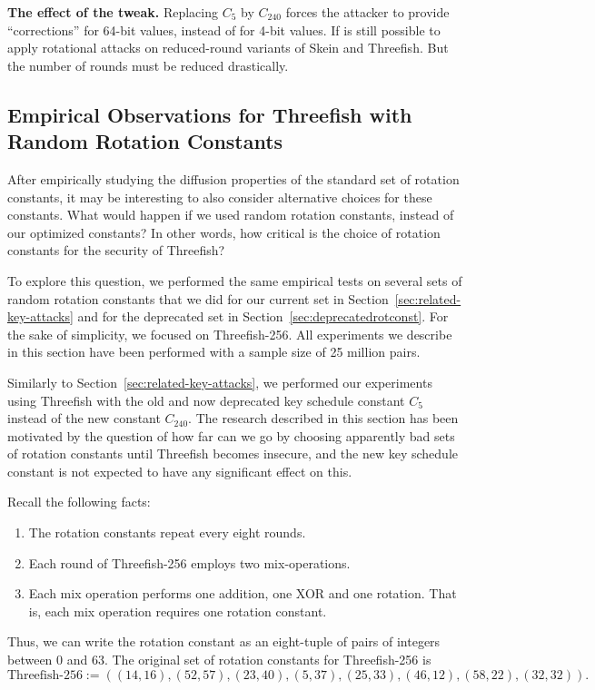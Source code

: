 \documentclass[11pt,twoside]{article}
\newcommand{\TheConst}{C_{240}} %
\begin{document}
\medskip

{\bf The effect of the tweak.}
Replacing $C_5$ by $C_{240}$ forces the attacker to provide ``corrections''
for 64-bit values, instead of for 4-bit values. If is still possible to
apply rotational attacks on reduced-round variants of Skein and Threefish. 
But the number of rounds must be reduced drastically. 


\subsection{Empirical Observations for Threefish with Random Rotation Constants}
\label{sec:random-constants}

After empirically studying the diffusion properties of the standard set of rotation constants, it may be interesting to also consider alternative choices for these constants. What would happen if we used random rotation constants, instead of our optimized constants? In other words, how critical is the choice of rotation constants for the security of Threefish? 

To explore this question, we performed the same empirical tests on several sets of random rotation constants that we did for our current set in Section~\ref{sec:related-key-attacks} and for the deprecated set in Section~\ref{sec:deprecatedrotconst}. For the sake of simplicity, we focused on Threefish-256. All experiments we describe in this section have been performed with a sample size of 25 million pairs. 

Similarly to Section~\ref{sec:related-key-attacks}, we performed our 
experiments using
Threefish with the old and now deprecated key schedule constant $C_5$ instead
of the new constant $\TheConst$. The research described in this section has
been motivated by the question of how far can we go by choosing apparently bad
sets of rotation constants until Threefish becomes insecure, and the new key
schedule constant is not expected to have any significant effect on this. 

Recall the following facts: 
\begin{enumerate}
 \item The rotation constants repeat every eight rounds.
 \item Each round of Threefish-256 employs two mix-operations.
 \item Each mix operation performs one addition, one XOR and one rotation. 
       That is, each mix operation requires one rotation constant.
\end{enumerate}
Thus, we can write the rotation constant as an eight-tuple of pairs of integers between 0 and 63. The original set of rotation constants for Threefish-256 is
    \[ \mbox{Threefish-256} := ((14,16), (52,57), (23,40), (5,37), 
                                (25,33), (46,12), (58,22), (32,32)). \]
\end{document}
